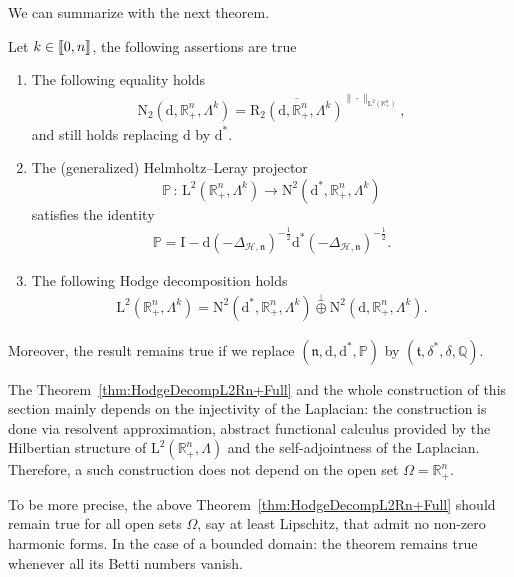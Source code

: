 \documentclass[AHL,Unicode,longabstracts,published]{cedram}
\newcommand{\bbP}{\mathbb{P}}
\newcommand{\bbR}{\mathbb{R}}
\newcommand{\bbQ}{\mathbb{Q}}
\newcommand{\rmd}{\mathrm{d}}
\newcommand{\rmL}{\mathrm{L}}
\newcommand{\rmR}{\mathrm{R}}
\newcommand{\rmN}{\mathrm{N}}
\newcommand{\rmI}{\mathrm{I}}
\newcommand{\clH}{\mathcal{H}}
\newcommand{\fkn}{\mathfrak{n}}
\newcommand{\fkt}{\mathfrak{t}}
\newcommand{\llbracket}{\mathopen{[\mkern -2.7mu[}}
\newcommand{\rrbracket}{\mathclose{]\mkern -2.7mu]}}
\newcommand{\llb}{\llbracket}
\newcommand{\rrb}{\rrbracket}
\begin{document}
We can summarize with the next theorem.

\pagebreak
\begin{theo}\label{thm:HodgeDecompL2Rn+Full}
Let $k\in\llb 0,n\rrb$, the following assertions are true
\begin{enumerate}
\item\label{theo2.21.1} The following equality holds
\begin{align*}
{\rmN }_{2}\left(\rmd,\bbR^n_+,\Lambda^k\right) = \overline{{\rmR }_{2}\left(\rmd,\bbR^n_+,\Lambda^k\right)}^{\|\cdot\|_{{\rmL}^{2}\left(\bbR^n_+\right)}},
\end{align*}
and still holds replacing $\rmd$ by $\rmd^\ast$.
\item\label{theo2.21.2} The (generalized) Helmholtz--Leray projector
\[
\bbP\,:\, {\rmL}^{2}\left(\bbR^n_+,\Lambda^k\right)\longrightarrow {\rmN}^{2}\left(\rmd^\ast,\bbR^n_+,\Lambda^k\right)
\]
satisfies the identity
\begin{align*}
\bbP = \rmI  - \rmd(-\Delta_{\clH,\fkn})^{-\frac{1}{2}}\rmd^\ast(-\Delta_{\clH,\fkn})^{-\frac{1}{2}} .
\end{align*}
\item\label{theo2.21.3} The following Hodge decomposition holds
\begin{align*}
{\rmL}^{2}\left(\bbR^n_+,\Lambda^k\right) = {\rmN}^{2}\left(\rmd^\ast,\bbR^n_+,\Lambda^k\right) \overset{\perp}{\oplus} {\rmN}^{2}\left(\rmd,\bbR^n_+,\Lambda^k\right).
\end{align*}
\end{enumerate}
Moreover, the result remains true if we replace $(\fkn,\rmd,\rmd^\ast,\bbP)$ by $(\fkt,\delta^{\ast},\delta,\bbQ)$.
\end{theo}


\begin{rema}
The Theorem~\ref{thm:HodgeDecompL2Rn+Full} and the whole construction of this section mainly depends on the injectivity of the Laplacian: the construction is done via resolvent approximation, abstract functional calculus provided by the Hilbertian structure of $\rmL^2(\bbR^n_+,\Lambda)$ and the self-adjointness of the Laplacian. Therefore, a such construction does not depend on the open set $\Omega=\bbR^n_+$.

To be more precise, the above Theorem~\ref{thm:HodgeDecompL2Rn+Full} should remain true for all open sets $\Omega$, say at least Lipschitz, that admit no non-zero harmonic forms. In the case of a bounded domain: the theorem remains true whenever all its Betti numbers vanish.
\end{rema}
\end{document}
